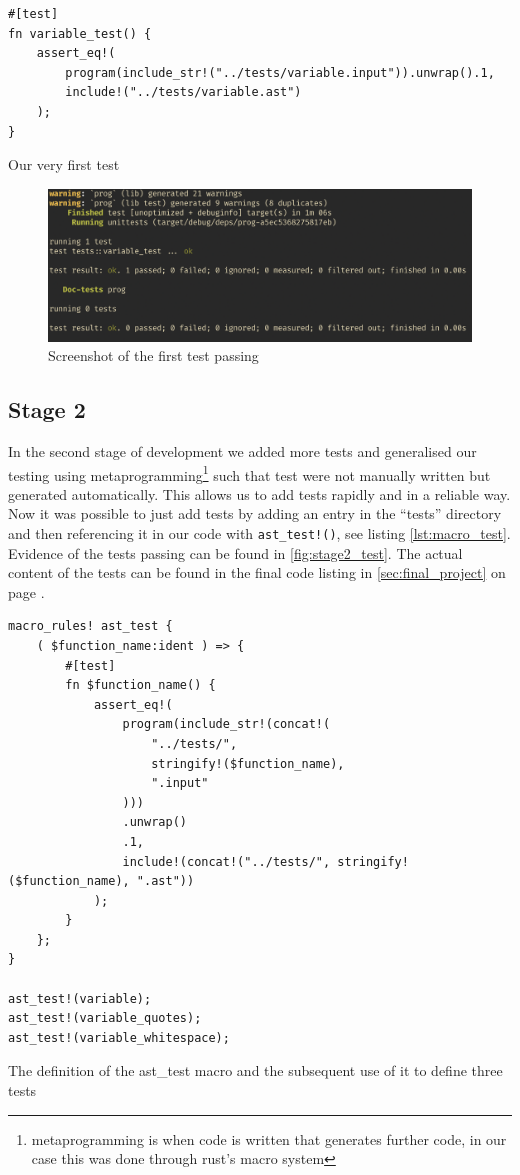 \documentclass{article}
\begin{document}

\begin{listing}
	\begin{verbatim}
#[test]
fn variable_test() {
	assert_eq!(
		program(include_str!("../tests/variable.input")).unwrap().1,
		include!("../tests/variable.ast")
	);
}
	\end{verbatim}
	\caption{Our very first test}
	\label{lst:first_test}
\end{listing}

\begin{figure}
	\includegraphics[width=\textwidth]{stage1_test}
	\caption{Screenshot of the first test passing}
	\label{fig:stage1_test}
\end{figure}

\subsection{Stage 2}

In the second stage of development we added more tests and generalised our
testing using metaprogramming\footnote{metaprogramming is when code is written
that generates further code, in our case this was done through rust's macro
system} such that test were not manually written but generated automatically.
This allows us to add tests rapidly and in a reliable way. Now it was possible
to just add tests by adding an entry in the ``tests'' directory and then
referencing it in our code with \texttt{ast_test!()}, see listing
\autoref{lst:macro_test}. Evidence of the tests passing can be found in
\autoref{fig:stage2_test}. The actual content of the tests can be found in the
final code listing in \autoref{sec:final_project} on page
\pageref{sec:final_project}.

\begin{listing}
	\begin{verbatim}
macro_rules! ast_test {
	( $function_name:ident ) => {
		#[test]
		fn $function_name() {
			assert_eq!(
				program(include_str!(concat!(
					"../tests/",
					stringify!($function_name),
					".input"
				)))
				.unwrap()
				.1,
				include!(concat!("../tests/", stringify!($function_name), ".ast"))
			);
		}
	};
}

ast_test!(variable);
ast_test!(variable_quotes);
ast_test!(variable_whitespace);
	\end{verbatim}
	\caption{The definition of the ast\_test macro and the subsequent use of
	it to define three tests}
	\label{lst:macro_test}
\end{listing}
\end{document}
